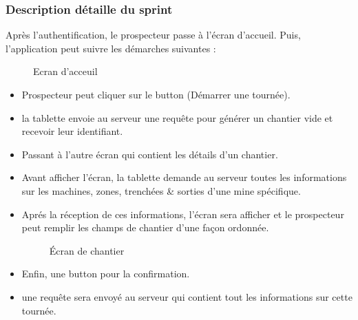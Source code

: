 \subsubsection{Description d\'etaille du sprint}

Apr\`es l'authentification, le prospecteur passe \`a l'\'ecran d'accueil. Puis, l'application peut suivre les d\'emarches suivantes :
\begin{figure}[H]
	\caption{\label{fig:my-label} Ecran d'acceuil}
\end{figure}
\begin{itemize}
\item Prospecteur peut cliquer sur le button (D\'emarrer une tourn\'ee).
\item la tablette envoie au serveur une requ\^ete pour g\'en\'erer un chantier vide et recevoir leur identifiant.
\item Passant \`a l'autre \'ecran qui contient les d\'etails d'un chantier.
\item Avant afficher l'\'ecran, la tablette demande au serveur toutes les informations sur les machines, zones, trench\'ees \& sorties d'une mine sp\'ecifique.
\item Apr\'es la r\'eception de ces informations, l'\'ecran sera afficher et le prospecteur peut remplir les champs de chantier d'une fa\c{c}on ordonn\'ee.
\begin{figure}[H]
	\caption{\label{fig:my-label} \'Ecran de chantier}
\end{figure}
\item Enfin, une button pour la  confirmation.
\item une requ\^ete sera envoy\'e au serveur qui contient tout les informations sur cette tourn\'ee.
\end{itemize} 

